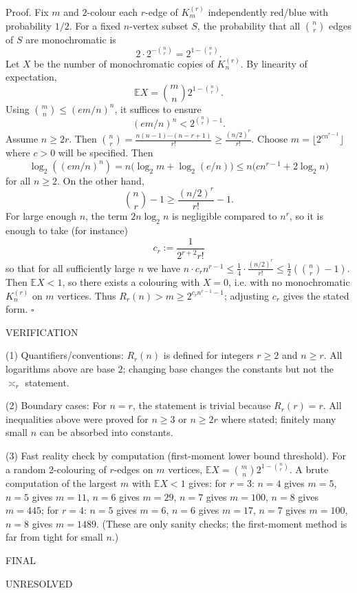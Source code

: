 Proof.
Fix $m$ and $2$-colour each $r$-edge of $K_m^{(r)}$ independently red/blue with probability $1/2$.
For a fixed $n$-vertex subset $S$, the probability that all $\binom{n}{r}$ edges of $S$ are monochromatic is
\[
2\cdot 2^{-\binom{n}{r}} = 2^{1-\binom{n}{r}}.
\]
Let $X$ be the number of monochromatic copies of $K_n^{(r)}$. By linearity of expectation,
\[
\mathbb{E}X = \binom{m}{n} 2^{1-\binom{n}{r}}.
\]
Using $\binom{m}{n}\le (em/n)^n$, it suffices to ensure
\[
(em/n)^n < 2^{\binom{n}{r}-1}.
\]
Assume $n\ge 2r$. Then
$\binom{n}{r} = \frac{n(n-1)\cdots(n-r+1)}{r!} \ge \frac{(n/2)^r}{r!}$.
Choose $m = \lfloor 2^{c n^{r-1}}\rfloor$ where $c>0$ will be specified.
Then
\[
\log_2((em/n)^n) = n\bigl(\log_2 m + \log_2(e/n)\bigr)
\le n\bigl(c n^{r-1} + 2\log_2 n\bigr)
\]
for all $n\ge 2$.
On the other hand,
\[
\binom{n}{r}-1 \ge \frac{(n/2)^r}{r!}-1.
\]
For large enough $n$, the term $2n\log_2 n$ is negligible compared to $n^r$, so it is enough to take (for instance)
\[
c_r := \frac{1}{2^{r+2} r!}
\]
so that for all sufficiently large $n$ we have
$n\cdot c_r n^{r-1} \le \frac{1}{4}\cdot \frac{(n/2)^r}{r!} \le \frac{1}{2}(\binom{n}{r}-1)$.
Then $\mathbb{E}X<1$, so there exists a colouring with $X=0$, i.e. with no monochromatic $K_n^{(r)}$ on $m$ vertices.
Thus $R_r(n)>m\ge 2^{c_r n^{r-1}-1}$; adjusting $c_r$ gives the stated form. \hfill$\square$

VERIFICATION

(1) Quantifiers/conventions: $R_r(n)$ is defined for integers $r\ge 2$ and $n\ge r$.
All logarithms above are base $2$; changing base changes the constants but not the $\asymp_r$ statement.

(2) Boundary cases: For $n=r$, the statement is trivial because $R_r(r)=r$.
All inequalities above were proved for $n\ge 3$ or $n\ge 2r$ where stated; finitely many small $n$ can be absorbed into constants.

(3) Fast reality check by computation (first-moment lower bound threshold).
For a random $2$-colouring of $r$-edges on $m$ vertices, $\mathbb{E}X = \binom{m}{n}2^{1-\binom{n}{r}}$.
A brute computation of the largest $m$ with $\mathbb{E}X<1$ gives:
for $r=3$: $n=4$ gives $m=5$, $n=5$ gives $m=11$, $n=6$ gives $m=29$, $n=7$ gives $m=100$, $n=8$ gives $m=445$;
for $r=4$: $n=5$ gives $m=6$, $n=6$ gives $m=17$, $n=7$ gives $m=100$, $n=8$ gives $m=1489$.
(These are only sanity checks; the first-moment method is far from tight for small $n$.)

FINAL

UNRESOLVED

